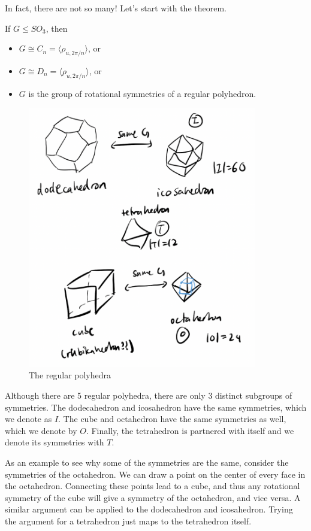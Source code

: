In fact, there are not so many! Let's start with the theorem.
\begin{theorem}
If $G \leq SO_3$, then 
\begin{itemize}
    \item $G \cong C_n = \langle \rho_{u, 2\pi/n}\rangle$, or
    \item $G \cong D_n = \langle \rho_{u, 2\pi/ n}\rangle$, or 
    \item $G$ is the group of rotational symmetries of a regular polyhedron.
\end{itemize}
\begin{figure}[H]
    \centering
    \includegraphics[width=10cm]{Lecture Files and Images/lec18-hedra.png}
    \caption{The regular polyhedra}
\end{figure}

\end{theorem}
Although there are 5 regular polyhedra, there are only 3 distinct subgroups of symmetries. 
The dodecahedron and icosahedron have the same symmetries, which we denote as $I$.
The cube and octahedron have the same symmetries as well, which we denote by $O$.
Finally, the tetrahedron is partnered with itself and we denote its symmetries with $T$.

As an example to see why some of the symmetries are the same, consider the symmetries of the octahedron. 
We can draw a point on the center of every face in the octahedron. 
Connecting these points lead to a cube, and thus any rotational symmetry of the cube will give a symmetry of the octahedron, and vice versa. 
A similar argument can be applied to the dodecahedron and icosahedron.
Trying the argument for a tetrahedron just maps to the tetrahedron itself.


